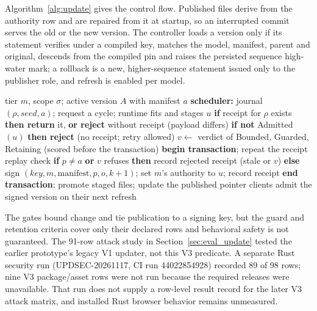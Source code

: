 \documentclass[sigconf]{acmart}
\theoremstyle{acmdefinition}\newtheorem{property}{Property}
\begin{document}
Algorithm~\ref{alg:update} gives the control flow. Published files derive from the authority row and are repaired from it at startup, so an interrupted commit serves the old or the new version. The controller loads a version only if its statement verifies under a compiled key, matches the model, manifest, parent and original, descends from the compiled pin and raises the persisted sequence high-water mark; a rollback is a new, higher-sequence statement issued only to the publisher role, and refresh is enabled per model.

\begin{algorithm}[t]
\caption{Current Rust V3 guarded-update design (Definition~\ref{def:accept}); the 91-row prototype attack study tested the separate legacy V1 updater.}
\label{alg:update}
\begin{algorithmic}[1]
\Require tier $m$, scope $\sigma$; active version $A$ with manifest $a$
\State \textbf{scheduler:} journal $(\rho,\mathit{seed},a)$; request a cycle; runtime fits and stages $u$
\State \textbf{if} receipt for $\rho$ exists \textbf{then return} it, \textbf{or reject} without receipt (payload differs)
\State \textbf{if not} Admitted$(u)$ \textbf{then reject} (no receipt; retry allowed)
\State $v\gets$ verdict of Bounded, Guarded, Retaining (scored before the transaction)
\State \textbf{begin transaction}; repeat the receipt replay check
\State \textbf{if} $p\ne a$ \textbf{or} $v$ refuses \textbf{then} record rejected receipt (stale or $v$)
\State \textbf{else} sign $(\mathit{key},m,\text{manifest},p,o,k{+}1)$; set $m$'s authority to $u$; record receipt
\State \textbf{end transaction}; promote staged files; update the published pointer
\State clients admit the signed version on their next refresh
\end{algorithmic}
\end{algorithm}

The gates bound change and tie publication to a signing key, but the guard and retention criteria cover only their declared rows and behavioral safety is not guaranteed. The 91-row attack study in Section~\ref{sec:eval_update} tested the earlier prototype's legacy V1 updater, not this V3 predicate. A separate Rust security run (UPDSEC-20261117, CI run 44022854928) recorded 89 of 98 rows; nine V3 package/asset rows were not run because the required releases were unavailable. That run does not supply a row-level result record for the later V3 attack matrix, and installed Rust browser behavior remains unmeasured.
\end{document}
